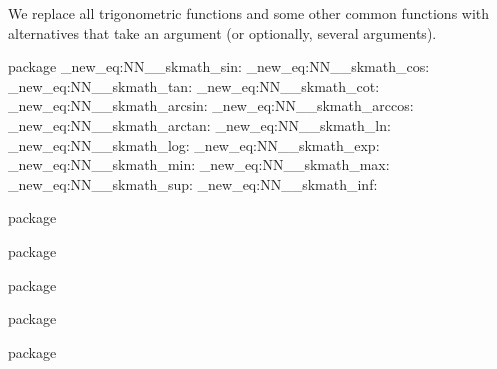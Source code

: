 \documentclass[commonsets,load]{skdoc}
\begin{document}
  We replace all trigonometric functions and some other
  common functions with alternatives that take an argument
  (or optionally, several arguments).
\begin{MacroCode}{package}
\cs_new_eq:NN\__skmath_sin:\sin
\cs_new_eq:NN\__skmath_cos:\cos
\cs_new_eq:NN\__skmath_tan:\tan
\cs_new_eq:NN\__skmath_cot:\cot
\cs_new_eq:NN\__skmath_arcsin:\arcsin
\cs_new_eq:NN\__skmath_arccos:\arccos
\cs_new_eq:NN\__skmath_arctan:\arctan
\cs_new_eq:NN\__skmath_ln:\log
\cs_new_eq:NN\__skmath_log:\log
\cs_new_eq:NN\__skmath_exp:\exp
\cs_new_eq:NN\__skmath_min:\min
\cs_new_eq:NN\__skmath_max:\max
\cs_new_eq:NN\__skmath_sup:\sup
\cs_new_eq:NN\__skmath_inf:\inf
\end{MacroCode}
  \begin{macro}{\sin}
\begin{MacroCode}{package}
\RenewDocumentCommand{}
\end{MacroCode}
  \end{macro}
  \begin{macro}{\cos}
\begin{MacroCode}{package}
\RenewDocumentCommand{}
\end{MacroCode}
  \end{macro}
  \begin{macro}{\tan}
\begin{MacroCode}{package}
\RenewDocumentCommand{}
\end{MacroCode}
  \end{macro}
  \begin{macro}{\cot}
\begin{MacroCode}{package}
\RenewDocumentCommand{}
\end{MacroCode}
  \end{macro}
  \begin{macro}{\arcsin}
\begin{MacroCode}{package}
\RenewDocumentCommand{}
\end{MacroCode}
  \end{macro}
\end{document}
